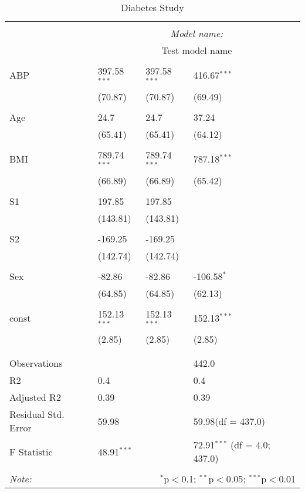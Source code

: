 \begin{table}[!htbp] \centering
  \caption{Diabetes Study}
  \label{}
\begin{tabularx}{\textwidth}{lXXX}
\\[-1.8ex]\hline
\hline \\[-1.8ex]
& \multicolumn{3}{c}{\textit{Model name:}} \
\cr \cline{3-4}
\\[-1.8ex] & \multicolumn{3}{c}{Test model name} \\\hline \\[-1.8ex]
 ABP & 397.58$^{***}$ & 397.58$^{***}$ & 416.67$^{***}$ \\
  & (70.87) & (70.87) & (69.49) \\
  & & & \\
 Age & 24.7$^{}$ & 24.7$^{}$ & 37.24$^{}$ \\
  & (65.41) & (65.41) & (64.12) \\
  & & & \\
 BMI & 789.74$^{***}$ & 789.74$^{***}$ & 787.18$^{***}$ \\
  & (66.89) & (66.89) & (65.42) \\
  & & & \\
 S1 & 197.85$^{}$ & 197.85$^{}$ & \\
  & (143.81) & (143.81) & \\
  & & & \\
 S2 & -169.25$^{}$ & -169.25$^{}$ & \\
  & (142.74) & (142.74) & \\
  & & & \\
 Sex & -82.86$^{}$ & -82.86$^{}$ & -106.58$^{*}$ \\
  & (64.85) & (64.85) & (62.13) \\
  & & & \\
 const & 152.13$^{***}$ & 152.13$^{***}$ & 152.13$^{***}$ \\
  & (2.85) & (2.85) & (2.85) \\
  & & & \\
\hline \\[-1.8ex]
 Observations &   &   & 442.0 \\
 R${2}$ & 0.4 &   & 0.4 \\
 Adjusted R${2}$ & 0.39 &   & 0.39 \\
 Residual Std. Error & 59.98 &   & 59.98(df = 437.0)  \\
 F Statistic & 48.91$^{***}$  &     & 72.91$^{***}$ (df = 4.0; 437.0) \\
\hline
\hline \\[-1.8ex]
\textit{Note:} & \multicolumn{3}{r}{$^{*}$p$<$0.1; $^{**}$p$<$0.05; $^{***}$p$<$0.01} \\
\end{tabularx}
\end{table}